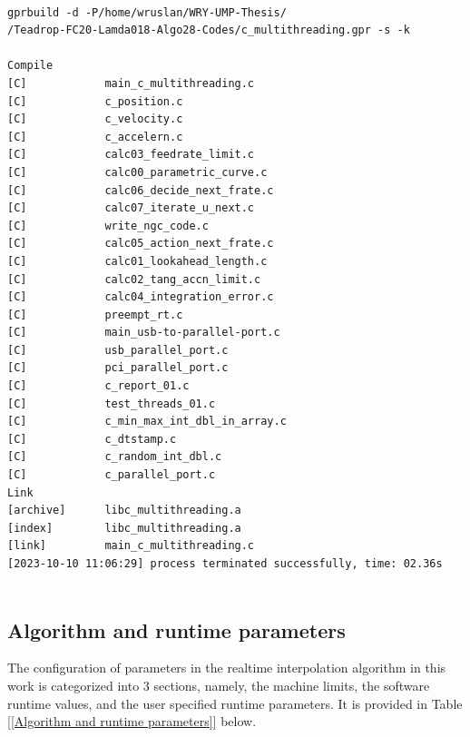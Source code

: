 \begin{lstlisting}[caption={Snippet of Algorithm Compilation, Binding and Linking}, label=snp-Snippet of Algorithm Compilation Binding and Linking]	
	
gprbuild -d -P/home/wruslan/WRY-UMP-Thesis/
/Teadrop-FC20-Lamda018-Algo28-Codes/c_multithreading.gpr -s -k
	
Compile
[C]            main_c_multithreading.c
[C]            c_position.c
[C]            c_velocity.c
[C]            c_accelern.c
[C]            calc03_feedrate_limit.c
[C]            calc00_parametric_curve.c
[C]            calc06_decide_next_frate.c
[C]            calc07_iterate_u_next.c
[C]            write_ngc_code.c
[C]            calc05_action_next_frate.c
[C]            calc01_lookahead_length.c
[C]            calc02_tang_accn_limit.c
[C]            calc04_integration_error.c
[C]            preempt_rt.c
[C]            main_usb-to-parallel-port.c
[C]            usb_parallel_port.c
[C]            pci_parallel_port.c
[C]            c_report_01.c
[C]            test_threads_01.c
[C]            c_min_max_int_dbl_in_array.c
[C]            c_dtstamp.c
[C]            c_random_int_dbl.c
[C]            c_parallel_port.c
Link
[archive]      libc_multithreading.a
[index]        libc_multithreading.a
[link]         main_c_multithreading.c
[2023-10-10 11:06:29] process terminated successfully, time: 02.36s
	
\end{lstlisting}


\clearpage
\pagebreak
\subsection{Algorithm and runtime parameters}\label{tab-Algorithm and runtime parameters}

The configuration of parameters in the realtime interpolation algorithm in this work is categorized into 3 sections, namely, the machine limits, the software runtime values, and the user specified runtime parameters. It is provided in Table [\ref{Algorithm and runtime parameters}] below. \\


